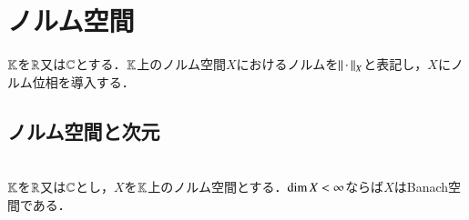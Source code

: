 \chapter{ノルム空間}
$\mathbb{K}$を$\mathbb{R}$又は$\mathbb{C}$とする．$\mathbb{K}$上のノルム空間$X$におけるノルムを$\left\|\, \cdot\, \right\|_{X}$と表記し，$X$にノルム位相を導入する．
\section{ノルム空間と次元}	
	\begin{screen}
		\begin{thm}[有限次元空間は完備]\mbox{}\\
			$\mathbb{K}$を$\mathbb{R}$又は$\mathbb{C}$とし，$X$を$\mathbb{K}$上のノルム空間とする．$\operatorname{dim} X < \infty$ならば$X$はBanach空間である．
			\label{thm:finite_dimension_normed_space_Banach}
		\end{thm}
	\end{screen}

